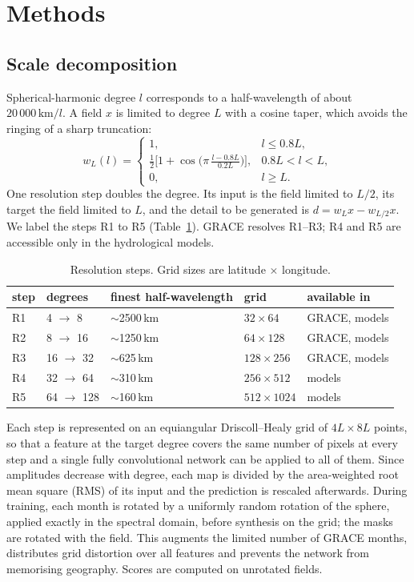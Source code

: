 \documentclass[11pt,a4paper]{article}
\begin{document}
\section{Methods}\label{sec:methods}

\subsection{Scale decomposition}
Spherical-harmonic degree $l$ corresponds to a half-wavelength of about
$20\,000\,\mathrm{km}/l$. A field $x$ is limited to degree $L$ with a cosine taper, which avoids
the ringing of a sharp truncation:
\begin{equation}
  w_L(l) =
  \begin{cases}
    1, & l \le 0.8L,\\[2pt]
    \tfrac12\bigl[1 + \cos\bigl(\pi\,\tfrac{l - 0.8L}{0.2L}\bigr)\bigr], & 0.8L < l < L,\\[2pt]
    0, & l \ge L.
  \end{cases}
\end{equation}
One resolution step doubles the degree. Its input is the field limited to $L/2$, its target
the field limited to $L$, and the detail to be generated is $d = w_L x - w_{L/2} x$. We
label the steps R1 to R5 (Table~\ref{tab:steps}). GRACE resolves R1--R3; R4 and R5 are
accessible only in the hydrological models.

\begin{table}[ht]
\centering\small
\caption{Resolution steps. Grid sizes are latitude $\times$ longitude.}
\label{tab:steps}
\begin{tabular}{lllll}
  \toprule
  step & degrees & finest half-wavelength & grid & available in \\
  \midrule
  R1 & 4 $\to$ 8    & $\sim$2500\,km & $32\times64$    & GRACE, models \\
  R2 & 8 $\to$ 16   & $\sim$1250\,km & $64\times128$   & GRACE, models \\
  R3 & 16 $\to$ 32  & $\sim$625\,km  & $128\times256$  & GRACE, models \\
  R4 & 32 $\to$ 64  & $\sim$310\,km  & $256\times512$  & models \\
  R5 & 64 $\to$ 128 & $\sim$160\,km  & $512\times1024$ & models \\
  \bottomrule
\end{tabular}
\end{table}

Each step is represented on an equiangular Driscoll--Healy grid of $4L \times 8L$ points, so
that a feature at the target degree covers the same number of pixels at every step and a single
fully convolutional network can be applied to all of them. Since amplitudes decrease with
degree, each map is divided by the area-weighted root mean square (RMS) of its input and the
prediction is rescaled afterwards. During training, each month is rotated by a uniformly random
rotation of the sphere, applied exactly in the spectral domain, before synthesis on the grid;
the masks are rotated with the field. This augments the limited number of GRACE months,
distributes grid distortion over all features and prevents the network from memorising
geography. Scores are computed on unrotated fields.
\end{document}
